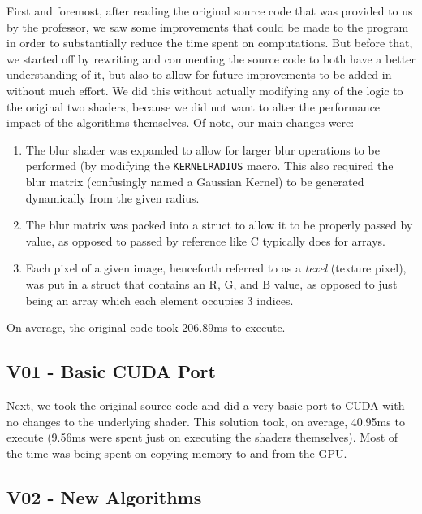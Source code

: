 \documentclass[10pt,journal,compsoc]{IEEEtran}
\def\code#1{\texttt{#1}}
\begin{document}
\noindent First and foremost, after reading the original source code that was provided to us by the professor, we saw some improvements that could be made to the program in order to substantially reduce the time spent on computations. But before that, we started off by rewriting and commenting the source code to both have a better understanding of it, but also to allow for future improvements to be added in without much effort. We did this without actually modifying any of the logic to the original two shaders, because we did not want to alter the performance impact of the algorithms themselves. Of note, our main changes were:
\begin{enumerate}
    \item The blur shader was expanded to allow for larger blur operations to be performed (by modifying the \code{KERNELRADIUS} macro. This also required the blur matrix (confusingly named a Gaussian Kernel) to be generated dynamically from the given radius.
    \item The blur matrix was packed into a struct to allow it to be properly passed by value, as opposed to passed by reference like C typically does for arrays.
    \item Each pixel of a given image, henceforth referred to as a \textit{texel} (texture pixel), was put in a struct that contains an R, G, and B value, as opposed to just being an array which each element occupies 3 indices.
\end{enumerate}

\noindent On average, the original code took 206.89ms to execute. \\


\subsection{V01 - Basic CUDA Port}
\label{sec:V01}

\noindent Next, we took the original source code and did a very basic port to CUDA with no changes to the underlying shader. This solution took, on average, 40.95ms to execute (9.56ms were spent just on executing the shaders themselves). Most of the time was being spent on copying memory to and from the GPU. \\


\subsection{V02 - New Algorithms}
\label{sec:V02}
\end{document}
